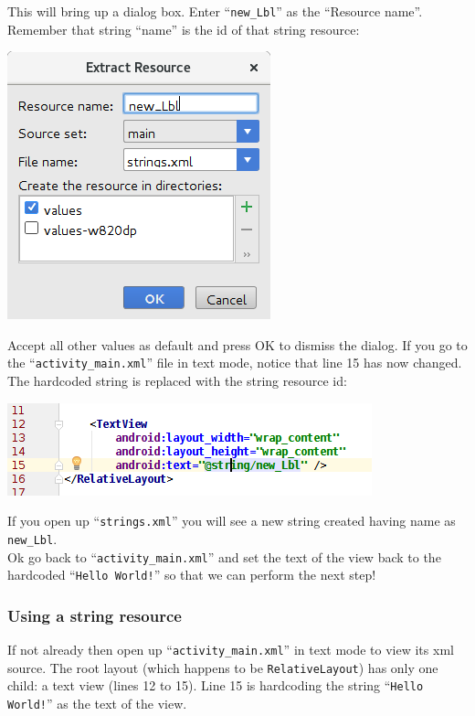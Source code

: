 This will bring up a dialog box. Enter ``\texttt{new\_Lbl}'' as the ``Resource name''. Remember that string ``name'' is the id of that string resource:

\begin{center}
	\includegraphics[scale=0.4]{chapters/ch04/images/14}
\end{center}

Accept all other values as default and press OK to dismiss the dialog. If you go to the ``\texttt{activity\_main.xml}'' file in text mode, notice that line 15 has now changed. The hardcoded string is replaced with the string resource id:

\begin{center}
	\includegraphics[scale=0.4]{chapters/ch04/images/15}
\end{center}

If you open up ``\texttt{strings.xml}'' you will see a new string created having name as \texttt{new\_Lbl}. \\

Ok go back to ``\texttt{activity\_main.xml}'' and set the text of the view back to the hardcoded ``\texttt{Hello World!}'' so that we can perform the next step!


\subsubsection{Using a string resource}

If not already then open up ``\texttt{activity\_main.xml}'' in text mode to view its xml source. The root layout (which happens to be \texttt{RelativeLayout}) has only one child: a text view (lines 12 to 15). Line 15 is hardcoding the string ``\texttt{Hello World!}'' as the text of the view.

